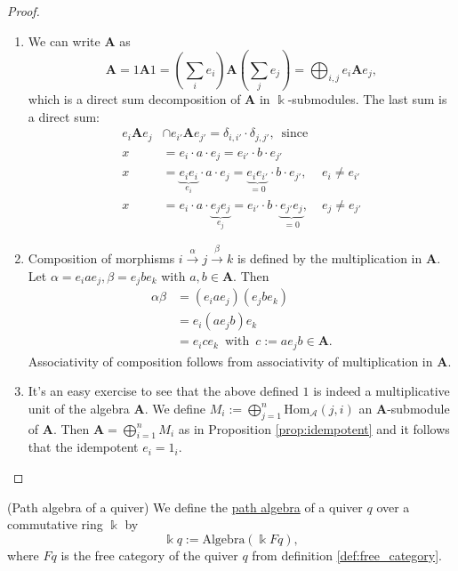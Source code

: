 \begin{proof}
\begin{enumerate}
\renewcommand{\labelenumi}{(\theenumi)}
\item We can write $\mathbf{A}$ as
\[
\mathbf{A} = 1\mathbf{A}1 = \left(\sum_{i}e_{i}\right) \mathbf{A} \left(\sum_{j} e_{j}\right) = \bigoplus_{i,j} e_{i}\mathbf{A}e_{j},
\]
which is a direct sum decomposition of $\mathbf{A}$ in $\Bbbk$-submodules. The last sum is a direct sum:
\begin{align}
e_{i}\mathbf{A}e_{j} &\cap e_{i'}\mathbf{A}e_{j'} = \delta_{i,i'} \cdot \delta_{j,j'},\,\text{ since }\\
x &= e_{i} \cdot a \cdot e_{j} = e_{i'} \cdot b \cdot e_{j'} \\
x &= \underbrace{e_{i}e_{i}}_{e_{i}} \cdot a \cdot e_{j} = \underbrace{e_{i}e_{i'}}_{= 0} \cdot b \cdot e_{j'},\, &e_{i} \neq e_{i'} \\
x &= e_{i} \cdot a \cdot \underbrace{e_{j}e_{j}}_{e_{j}} = e_{i'} \cdot b \cdot \underbrace{e_{j'}e_{j}}_{= 0},\, &e_{j} \neq e_{j'}
\end{align}

\item Composition of morphisms
$i \xrightarrow{\alpha} j \xrightarrow{\beta} k$ is defined by the multiplication in $\mathbf{A}$.
Let $\alpha = e_{i}ae_{j}, \beta = e_{j}be_{k}$ with $a, b\in \mathbf{A}$. Then
\begin{align}
\alpha \beta &= (e_{i}ae_{j})(e_{j}be_{k}) \\
&= e_{i}(ae_{j}b)e_{k} \\
&= e_{i}ce_{k}\,\text{ with }\, c := ae_{j}b \in \mathbf{A}.
\end{align}
Associativity of composition follows from associativity of multiplication in $\mathbf{A}$.

\item It's an easy exercise to see that the above defined $1$ is indeed a multiplicative unit of the algebra $\mathbf{A}$.
We define $M_{i} := \bigoplus_{j=1}^{n} \mathrm{Hom}_{\mathcal{A}}(j,i)$ an $\mathbf{A}$-submodule of $\mathbf{A}$.
Then $\mathbf{A} = \bigoplus_{i=1}^{n} M_{i}$ as in Proposition \ref{prop:idempotent} and it follows that the idempotent $e_{i} = 1_{i}$.
\end{enumerate}
\end{proof}

\begin{definition}{(Path algebra of a quiver)}\label{def:path_algebra}
We define the \ul{path algebra} of a quiver $q$ over a commutative ring $\Bbbk$ by
\[
\Bbbk q := \mathrm{Algebra}( \Bbbk Fq ),
\]
where $Fq$ is the free category of the quiver $q$ from definition \ref{def:free_category}.
\end{definition}

